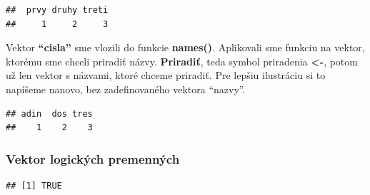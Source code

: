 \begin{verbatim}
##  prvy druhy treti 
##     1     2     3
\end{verbatim}

Vektor \textbf{``cisla''} sme vlozili do funkcie \textbf{names()}.
Aplikovali sme funkciu na vektor, ktorému sme chceli priradiť názvy.
\textbf{Priradiť}, teda symbol priradenia \textbf{\textless-}, potom už
len vektor s názvami, ktoré chceme priradiť. Pre lepšiu ilustráciu si to
napíšeme nanovo, bez zadefinovaného vektora ``nazvy''.

\begin{Shaded}
\begin{Highlighting}[]
\StringTok{ }\NormalTok{(}\NormalTok{, }\NormalTok{, }\NormalTok{)}

\end{Highlighting}
\end{Shaded}

\begin{verbatim}
## adin  dos tres 
##    1    2    3
\end{verbatim}

\hypertarget{vektor-logickuxfdch-premennuxfdch}{%
\subsubsection{Vektor logických
premenných}\label{vektor-logickuxfdch-premennuxfdch}}

\begin{Shaded}
\begin{Highlighting}[]

\StringTok{  }

\OperatorTok{==}\StringTok{ }
\end{Highlighting}
\end{Shaded}

\begin{verbatim}
## [1] TRUE
\end{verbatim}

\begin{Shaded}
\begin{Highlighting}[]
\OperatorTok{==}\StringTok{ }
\end{Highlighting}
\end{Shaded}

